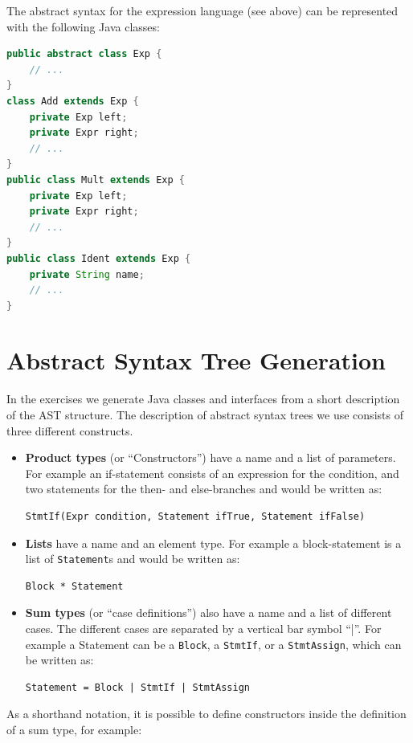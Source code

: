 \documentclass{scrartcl}
\begin{document}
The abstract syntax for the expression language (see above) can be represented with the following Java classes:

\begin{lstlisting}[language=Java,basicstyle=\scriptsize\ttfamily]
public abstract class Exp {
    // ...
}
class Add extends Exp {
    private Exp left;
    private Expr right;
    // ...
}
public class Mult extends Exp {
    private Exp left;
    private Expr right;
    // ...
}
public class Ident extends Exp {
    private String name;
    // ...
}
\end{lstlisting}

\section{Abstract Syntax Tree Generation}

In the exercises we generate Java classes and interfaces from a short description of the AST structure.
The description of abstract syntax trees we use consists of three different constructs.

\begin{itemize}
 \item \textbf{Product types} (or ``Constructors'') have a name and a list of parameters. For example an if-statement consists of an expression for the condition, and two statements for the then- and else-branches and would be written as:


\begin{lstlisting}
StmtIf(Expr condition, Statement ifTrue, Statement ifFalse)
\end{lstlisting}

 \item \textbf{Lists} have a name and an element type.
  For example a block-statement is a list of \lstinline!Statement!s and would be written as:
\begin{lstlisting}
Block * Statement
\end{lstlisting}

  \item \textbf{Sum types} (or ``case definitions'') also have a name and a list of different cases.
    The different cases are separated by a vertical bar symbol ``|''.
    For example a Statement can be a \lstinline!Block!, a \lstinline!StmtIf!, or a \lstinline!StmtAssign!, which can be written as:

\begin{lstlisting}
Statement = Block | StmtIf | StmtAssign
\end{lstlisting}
\end{itemize}
As a shorthand notation, it is possible to define constructors inside the definition of a sum type, for example:
\end{document}
